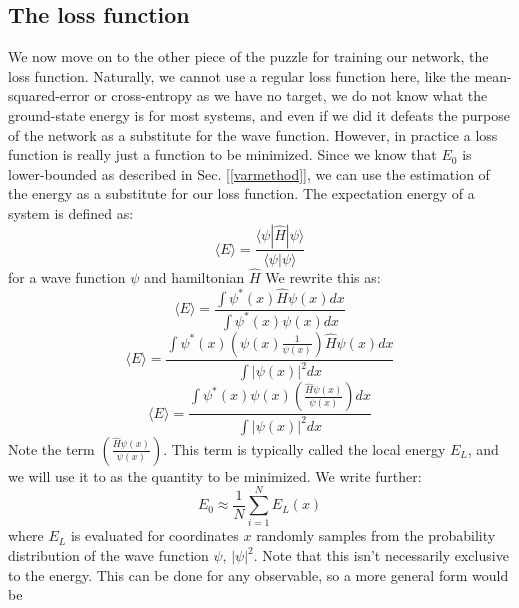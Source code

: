 \documentclass[12pt]{article}
\begin{document}
{\subsection{The loss function} \label{losssec}
We now move on to the other piece of the puzzle for training our network, the loss function. Naturally, we cannot use a regular loss function here, like the mean-squared-error or cross-entropy as we have no target, we do not know what the ground-state energy is for most systems, and even if we did it defeats the purpose of the network as a substitute for the wave function. However, in practice a loss function is really just a function to be minimized. Since we know that $E_0$ is lower-bounded as described in Sec. [\ref{varmethod}], we can use the estimation of the energy as a substitute for our loss function. 
\newline The expectation energy of a system is defined as:
\begin{equation*}
    \langle E \rangle = \frac{\langle \psi | \hat H | \psi \rangle}{\langle \psi | \psi \rangle}
\end{equation*}
for a wave function $\psi$ and hamiltonian $\hat H$
\newline
We rewrite this as:
\begin{equation*}
    \langle E \rangle = \frac{\int \psi^* (x) \hat H \psi(x) dx}{\int \psi^*(x) \psi(x) dx}
\end{equation*}
\begin{equation*}
    \langle E \rangle = \frac{\int \psi^* (x) \left(\psi(x) \frac{1}{\psi(x)} \right) \hat H \psi(x) dx}{\int | \psi(x)|^2 dx}
\end{equation*}
\begin{equation*}
    \langle E \rangle = \frac{\int \psi^* (x) \psi(x) \left(\frac{\hat H \psi(x)}{\psi(x)}\right) dx}{\int | \psi(x)|^2 dx}
\end{equation*}
Note the term $\left(\frac{\hat H \psi(x)}{\psi(x)}\right)$. This term is typically called the local energy $E_L$, and we will use it to as the quantity to be minimized. We write further:
\begin{equation} \label{loss}
    E_0 \approx \frac{1}{N} \sum_{i=1}^N E_L(x)
\end{equation}
where $E_L$ is evaluated for coordinates $x$ randomly samples from the probability distribution of the wave function $\psi$, $|\psi|^2$.
\newline
Note that this isn't necessarily exclusive to the energy. This can be done for any observable, so a more general form would be
}
\end{document}
